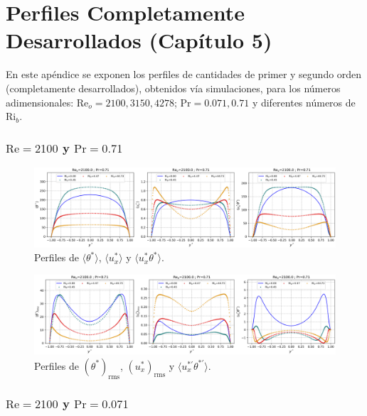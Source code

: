 \chapter{Perfiles Completamente Desarrollados (Capítulo 5)} \label{apen:desarrollado}

En este apéndice se exponen los perfiles de cantidades de primer y segundo orden (completamente desarrollados), obtenidos vía simulaciones, para los números adimensionales: $\text{Re}_o=2100,3150,4278$; $\text{Pr}=0\text{.}071,0\text{.}71$ y diferentes números de Ri$_b$. 

\subsection*{$\text{Re}=2100$ y $\text{Pr}=0\text{.}71$}

\begin{figure}[H]
  \centering
    \includegraphics[width=\textwidth]{figures/apendices/developed/Re2100-Pr071_merged_phi-ux-uxphi.png}
  \caption{Perfiles de  $\langle \theta^* \rangle$,  $\langle u^*_x \rangle$ y   $\langle u^*_x \theta^* \rangle$.}
  \label{fig:profs-Re2100-Pr071}
\end{figure}

\begin{figure}[H]
  \centering
    \includegraphics[width=\textwidth]{figures/apendices/developed/Re2100-Pr071_merged_phif-uxf-uxphif.png}
  \caption{Perfiles de  $( \theta^*)_{\text{rms}}$,  $(u^*_x)_{\text{rms}}$ y  $\langle u^{* \prime}_x \theta^{* \prime} \rangle$.}
  \label{fig:profs-Re2100-Pr071}
\end{figure}

\subsection*{$\text{Re}=2100$ y $\text{Pr}=0\text{.}071$}

